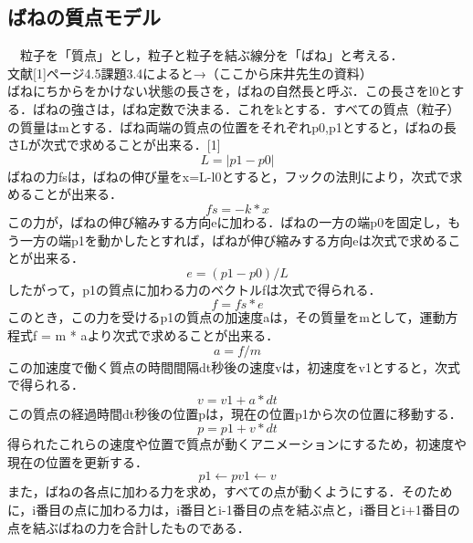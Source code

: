 \documentclass[11pt]{jreport}
\begin{document}
\subsection{ばねの質点モデル}
　粒子を「質点」とし，粒子と粒子を結ぶ線分を「ばね」と考える．\\
 文献[1]ページ4.5課題3.4によると→（ここから床井先生の資料）\\
ばねにちからをかけない状態の長さを，ばねの自然長と呼ぶ．この長さをl0とする．ばねの強さは，ばね定数で決まる．これをkとする．すべての質点（粒子）の質量はmとする．ばね両端の質点の位置をそれぞれp0,p1とすると，ばねの長さLが次式で求めることが出来る．[1]
\begin{equation}
  L = |p1-p0| \label{exp:sample}
\end{equation}
ばねの力fsは，ばねの伸び量をx=L-l0とすると，フックの法則により，次式で求めることが出来る．
\begin{equation}
  fs = -k*x \label{exp:sample}
\end{equation}
この力が，ばねの伸び縮みする方向eに加わる．ばねの一方の端p0を固定し，もう一方の端p1を動かしたとすれば，ばねが伸び縮みする方向eは次式で求めることが出来る．
\begin{equation}
  e = (p1 - p0) / L \label{exp:sample}
\end{equation}
したがって，p1の質点に加わる力のベクトルfは次式で得られる．
\begin{equation}
  f = fs * e \label{exp:sample}
\end{equation}
このとき，この力を受けるp1の質点の加速度aは，その質量をmとして，運動方程式f = m * aより次式で求めることが出来る．
\begin{equation}
 　a = f / m \label{exp:sample}
\end{equation}
この加速度で働く質点の時間間隔dt秒後の速度vは，初速度をv1とすると，次式で得られる．
\begin{equation}
  v = v1 + a * dt \label{exp:sample}
\end{equation}
この質点の経過時間dt秒後の位置pは，現在の位置p1から次の位置に移動する．
\begin{equation}
  p  = p1 + v * dt \label{exp:sample}
\end{equation}
得られたこれらの速度や位置で質点が動くアニメーションにするため，初速度や現在の位置を更新する．
\begin{equation}
  p1 ← p
  v1 ← v 
\end{equation}
 また，ばねの各点に加わる力を求め，すべての点が動くようにする．そのために，i番目の点に加わる力は，i番目とi-1番目の点を結ぶ点と，i番目とi+1番目の点を結ぶばねの力を合計したものである．\\
\end{document}
